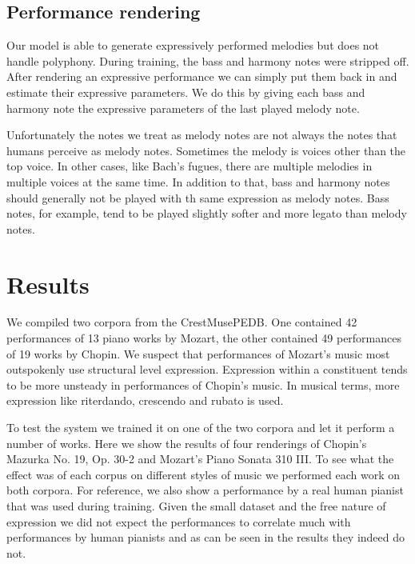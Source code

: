 \documentclass[a4paper,10pt]{article}
\begin{document}
\subsection{Performance rendering}

Our model is able to generate expressively performed melodies but does not handle polyphony. During training, the bass and harmony notes were stripped off. After rendering an expressive performance we can simply put them back in and estimate their expressive parameters. We do this by giving each bass and harmony note the expressive parameters of the last played melody note. 

Unfortunately the notes we treat as melody notes are not always the notes that humans perceive as melody notes. Sometimes the melody is voices other than the top voice. In other cases, like Bach's fugues, there are multiple melodies in multiple voices at the same time. In addition to that, bass and harmony notes should generally not be played with th same expression as melody notes. Bass notes, for example, tend to be played slightly softer and more legato than melody notes.



\section{Results}
\label{sec:results}

We compiled two corpora from the CrestMusePEDB. One contained 42 performances of 13 piano works by Mozart, the other contained 49 performances of 19 works by Chopin. We suspect that performances of Mozart's music most outspokenly use structural level expression. Expression within a constituent tends to be more unsteady in performances of Chopin's music. In musical terms, more expression like riterdando, crescendo and rubato is used.

To test the system we trained it on one of the two corpora and let it perform a number of works. Here we show the results of four renderings of Chopin's Mazurka No. 19, Op. 30-2 and Mozart's Piano Sonata 310 III. To see what the effect was of each corpus on different styles of music we performed each work on both corpora. For reference, we also show a performance by a real human pianist that was used during training. Given the small dataset and the free nature of expression we did not expect the performances to correlate much with performances by human pianists and as can be seen in the results they indeed do not. 
\end{document}
